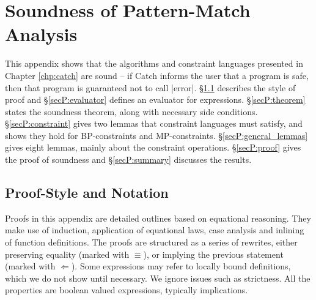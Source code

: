 \begin{comment}
instance Eq Value
instance Eq Expr

alt :: Alt -> Prop (Sat a)
pre' :: String -> [Expr] -> Prop (Sat Expr)
sub :: ([VarName],[Expr])
\end{code}

\begin{code}
-- for BP
anys :: String -> Constraint
instance Eq Constraint
\end{code}

\h{.mp}\begin{code}
-- for MP
type Constraint = [Val]
data Val = [Pattern] :* [Pattern] | Any deriving Eq
data Pattern = Pattern CtorName [Val] deriving Eq
complete :: CtorName -> Pattern
nonRecs :: CtorName -> [Int]
merge :: [Pattern] -> [Pattern] -> [Pattern]
non :: [Int]
rec :: [Int]
\end{code}
\end{comment}


\chapter{Soundness of Pattern-Match Analysis}
\label{chp:proof}

This appendix shows that the algorithms and constraint languages presented in Chapter \ref{chp:catch} are sound -- if Catch informs the user that a program is safe, then that program is guaranteed not to call |error|. \S\ref{secP:style} describes the style of proof and \S\ref{secP:evaluator} defines an evaluator for expressions. \S\ref{secP:theorem} states the soundness theorem, along with necessary side conditions. \S\ref{secP:constraint} gives two lemmas that constraint languages must satisfy, and shows they hold for BP-constraints and MP-constraints. \S\ref{secP:general_lemmas} gives eight lemmas, mainly about the constraint operations. \S\ref{secP:proof} gives the proof of soundness and \S\ref{secP:summary} discusses the results.


\section{Proof-Style and Notation}
\label{secP:style}

Proofs in this appendix are detailed outlines based on equational reasoning. They make use of induction, application of equational laws, case analysis and inlining of function definitions. The proofs are structured as a series of rewrites, either preserving equality (marked with $\equiv$), or implying the previous statement (marked with $\Leftarrow$). Some expressions may refer to locally bound definitions, which we do not show until necessary. We ignore issues such as strictness. All the properties are boolean valued expressions, typically implications.

